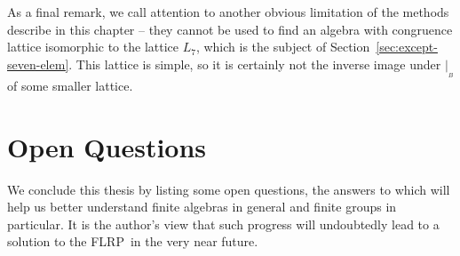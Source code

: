\documentclass[cm,dissertation]{uhthesis}
\theoremstyle{plain}
\theoremstyle{definition}
\theoremstyle{remark}
\numberwithin{theorem}{section}
\numberwithin{claim}{chapter}
\numberwithin{equation}{section}
\numberwithin{conjecture}{chapter}
\newcommand{\<}{\ensuremath{\langle}}
\renewcommand{\>}{\ensuremath{\rangle}}
\newcommand{\FLRP}{{\small FLRP}}
\newcommand{\0}{\ensuremath{\mathbf{0}}}
\newcommand{\1}{\ensuremath{\mathbf{1}}}
\newcommand{\2}{\ensuremath{\mathbf{2}}}
\newcommand{\3}{\ensuremath{\mathbf{3}}}
\newcommand{\4}{\ensuremath{\mathbf{4}}}
\newcommand{\5}{\ensuremath{\mathbf{5}}}
\newcommand{\resB}{\ensuremath{|_{_B}}}
\begin{document}
  As a final remark, we call attention to another obvious limitation of
  the methods describe in this chapter -- they cannot be used to find an
  algebra with congruence lattice isomorphic to the lattice $L_7$, which is the
  subject of Section~\ref{sec:except-seven-elem}.  
  This lattice is simple, so it is certainly not the inverse image under $\resB$ of some
  smaller lattice. 

\chapter{Open Questions}
\label{sec:open-questions}
We conclude this thesis by listing some open questions, the answers to which
will help us better understand finite algebras in general and finite groups in
particular.  It is the author's view that such progress will undoubtedly lead to
a solution to the \FLRP\ in the very near future.
\end{document}
